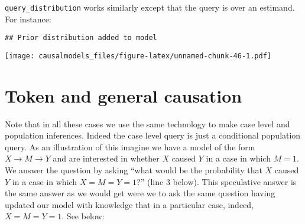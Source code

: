 \documentclass[
  12pt,
]{book}
\newenvironment{Shaded}{\begin{snugshade}}{\end{snugshade}}
\newcommand{\DataTypeTok}[1]{\textcolor[rgb]{0.13,0.29,0.53}{#1}}
\newcommand{\KeywordTok}[1]{\textcolor[rgb]{0.13,0.29,0.53}{\textbf{#1}}}
\newcommand{\NormalTok}[1]{#1}
\newcommand{\OperatorTok}[1]{\textcolor[rgb]{0.81,0.36,0.00}{\textbf{#1}}}
\newcommand{\StringTok}[1]{\textcolor[rgb]{0.31,0.60,0.02}{#1}}
\begin{document}
\texttt{query\_distribution} works similarly except that the query is over an estimand. For instance:

\begin{Shaded}
\end{Shaded}

\begin{verbatim}
## Prior distribution added to model
\end{verbatim}

\texttt{[image: causalmodels\_files/figure-latex/unnamed-chunk-46-1.pdf]}

\hypertarget{token-and-general-causation}{%
\section{Token and general causation}\label{token-and-general-causation}}

Note that in all these cases we use the same technology to make case level and population inferences. Indeed the case level query is just a conditional population query. As an illustration of this imagine we have a model of the form \(X \rightarrow M \rightarrow Y\) and are interested in whether \(X\) caused \(Y\) in a case in which \(M=1\). We answer the question by asking ``what would be the probability that \(X\) caused \(Y\) in a case in which \(X=M=Y=1\)?'' (line 3 below). This speculative answer is the same answer as we would get were we to ask the same question having updated our model with knowledge that in a particular case, indeed, \(X=M=Y=1\). See below:
\end{document}
